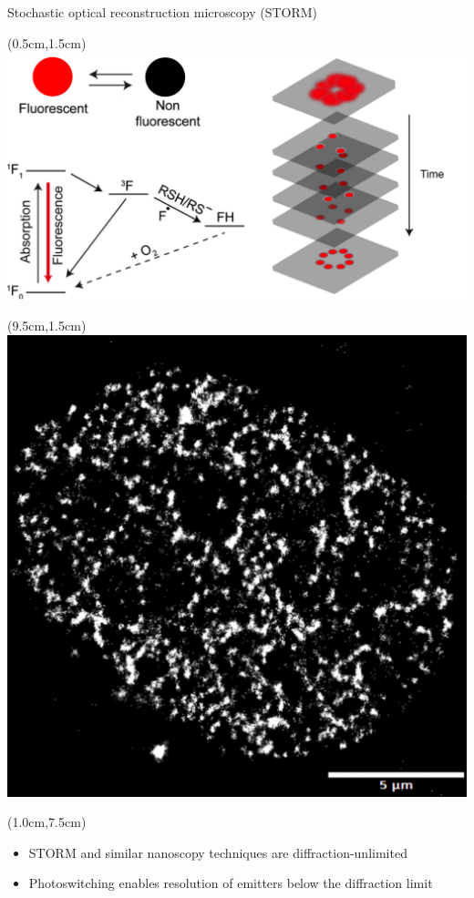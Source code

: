 \documentclass{beamer}					%
\begin{document}
\begin{frame}{Stochastic optical reconstruction microscopy (STORM)}
\begin{textblock*}{9cm}(0.5cm,1.5cm)
\includegraphics[width=\textwidth]{../../dissertation/dissertation/media/Intro-Cropped.png}
\end{textblock*}
\begin{textblock*}{5cm}(9.5cm,1.5cm)
\includegraphics[width=\textwidth]{../../dissertation/dissertation/media/STORM-Example.png}
\end{textblock*}
\begin{textblock*}{\textwidth}(1.0cm,7.5cm)
\begin{itemize}
\item STORM and similar nanoscopy techniques are diffraction-unlimited
\item Photoswitching enables resolution of emitters below the diffraction limit
\end{itemize}
\end{textblock*}
\end{frame}
\end{document}
